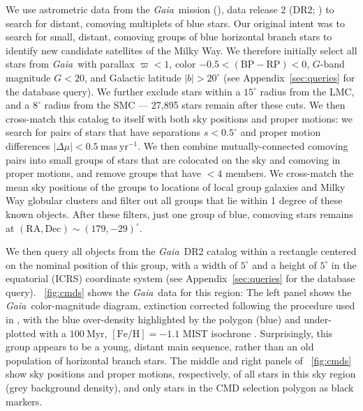 \documentclass[twocolumn]{aastex62}
\newcommand{\acronym}[1]{{\small{#1}}}
\newcommand{\gaia}{\textsl{Gaia}}
\newcommand{\DR}[1]{\acronym{DR#1}}
\newcommand{\masyr}{\ensuremath{\textrm{mas}~\textrm{yr}^{-1}}}
\newcommand{\feh}{\ensuremath{[\textrm{Fe} / \textrm{H}]}}
\newcommand{\bprp}{\ensuremath{\textrm{BP} - \textrm{RP}}}
\begin{document}
We use astrometric data from the \gaia\ mission (\citealt{Prusti:2016}), data release 2 (\DR{2}; \citealt{Gaia-Collaboration:2018, Lindegren:2018}) to search for distant, comoving multiplets of blue stars.
Our original intent was to search for small, distant, comoving groups of blue horizontal branch stars to identify new candidate satellites of the Milky Way.
We therefore initially select all stars from \gaia\ with parallax $\varpi < 1$, color $-0.5 < (\bprp) < 0$, $G$-band magnitude $G < 20$, and Galactic latitude $|b| > 20^\circ$ (see Appendix~\ref{sec:queries} for the database query).
We further exclude stars within a $15^\circ$ radius from the LMC, and a $8^\circ$ radius from the SMC --- 27,895 stars remain after these cuts.
We then cross-match this catalog to itself with both sky positions and proper motions: we search for pairs of stars that have separations $s < 0.5^\circ$ and proper motion differences $|\Delta \mu| < 0.5~\masyr$.
We then combine mutually-connected comoving pairs into small groups of stars that are colocated on the sky and comoving in proper motions, and remove groups that have $<4$ members.
We cross-match the mean sky positions of the groups to locations of local group galaxies \citep{McConnachie:2012} and Milky Way globular clusters \citep[2010 edition;][]{Harris:1996} and filter out all groups that lie within 1 degree of these known objects.
After these filters, just one group of blue, comoving stars remains at $(\textrm{RA}, \textrm{Dec}) \sim (179, -29)^\circ$.

We then query all objects from the \gaia\ \DR{2} catalog within a rectangle centered on the nominal position of this group, with a width of $5^\circ$ and a height of $5^\circ$ in the equatorial (ICRS) coordinate system (see Appendix~\ref{sec:queries} for the database query).
\figurename~\ref{fig:cmds} shows the \gaia\ data for this region:
The left panel shows the \gaia\ color-magnitude diagram, extinction corrected following the procedure used in \citet{Danielski:2018}, with the blue over-density highlighted by the polygon (blue) and under-plotted with a $100~\textrm{Myr}$, $\feh = -1.1$ \acronym{MIST} isochrone \citep[red line;][]{Dotter:2016, Choi:2016, Paxton:2011, Paxton:2013, Paxton:2015}.
Surprisingly, this group appears to be a young, distant main sequence, rather than an old population of horizontal branch stars.
The middle and right panels of \figurename~\ref{fig:cmds} show sky positions and proper motions, respectively, of all stars in this sky region (grey background density), and only stars in the CMD selection polygon as black markers.
\end{document}
